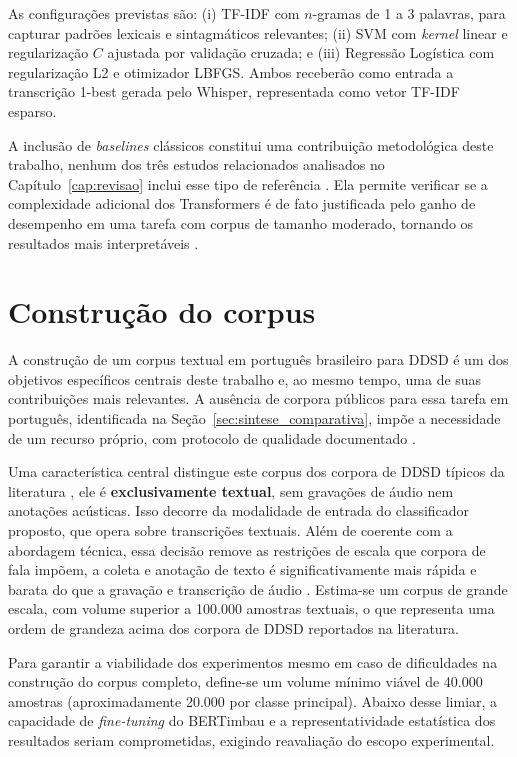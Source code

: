\documentclass[
    12pt,                %
    openright,           %
    oneside,             %
    a4paper,             %
    english,             %
    brazil               %
]{abntex2}
\begin{document}
As configurações previstas são: (i) TF-IDF com $n$-gramas de 1 a 3 palavras, para capturar padrões lexicais e sintagmáticos relevantes; (ii) SVM com \textit{kernel} linear e regularização $C$ ajustada por validação cruzada; e (iii) Regressão Logística com regularização L2 e otimizador LBFGS. Ambos receberão como entrada a transcrição 1-best gerada pelo Whisper, representada como vetor TF-IDF esparso.

A inclusão de \textit{baselines} clássicos constitui uma contribuição metodológica deste trabalho, nenhum dos três estudos relacionados analisados no Capítulo~\ref{cap:revisao} inclui esse tipo de referência \cite{Mallidi2018, Wagner2024, Dighe2024}. Ela permite verificar se a complexidade adicional dos Transformers é de fato justificada pelo ganho de desempenho em uma tarefa com corpus de tamanho moderado, tornando os resultados mais interpretáveis \cite{Weld2022, Manning2008}.

\section{Construção do corpus}
\label{sec:corpus}

A construção de um corpus textual em português brasileiro para DDSD é um dos objetivos específicos centrais deste trabalho e, ao mesmo tempo, uma de suas contribuições mais relevantes. A ausência de corpora públicos para essa tarefa em português, identificada na Seção~\ref{sec:sintese_comparativa}, impõe a necessidade de um recurso próprio, com protocolo de qualidade documentado \cite{Wazlawick2020}.

Uma característica central distingue este corpus dos corpora de DDSD típicos da literatura \cite{Mallidi2018, Wagner2024}, ele é \textbf{exclusivamente textual}, sem gravações de áudio nem anotações acústicas. Isso decorre da modalidade de entrada do classificador proposto, que opera sobre transcrições textuais. Além de coerente com a abordagem técnica, essa decisão remove as restrições de escala que corpora de fala impõem, a coleta e anotação de texto é significativamente mais rápida e barata do que a gravação e transcrição de áudio \cite{Møller2024}. Estima-se um corpus de grande escala, com volume superior a 100.000 amostras textuais, o que representa uma ordem de grandeza acima dos corpora de DDSD reportados na literatura.

Para garantir a viabilidade dos experimentos mesmo em caso de dificuldades na construção do corpus completo, define-se um volume mínimo viável de 40.000 amostras (aproximadamente 20.000 por classe principal). Abaixo desse limiar, a capacidade de \textit{fine-tuning} do BERTimbau e a representatividade estatística dos resultados seriam comprometidas, exigindo reavaliação do escopo experimental.
\end{document}
